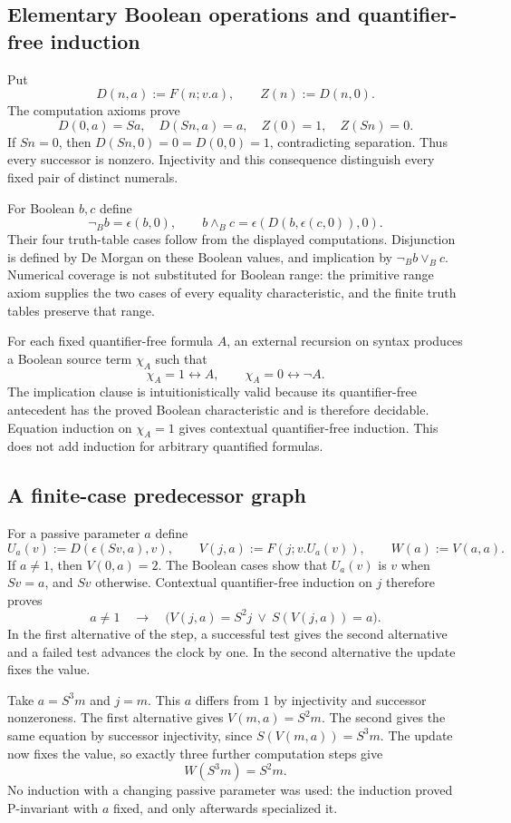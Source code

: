 \subsection{Elementary Boolean operations and quantifier-free induction}
Put
\[
D(n,a):=F(n;v.a),\qquad Z(n):=D(n,0).
\]
The computation axioms prove
\[
D(0,a)=Sa,\quad D(Sn,a)=a,\quad Z(0)=1,\quad Z(Sn)=0.
\]
If $Sn=0$, then $D(Sn,0)=0=D(0,0)=1$, contradicting separation.
Thus every successor is nonzero. Injectivity and this consequence
distinguish every fixed pair of distinct numerals.

For Boolean $b,c$ define
\[
\neg_B b=\epsilon(b,0),\qquad
b\mathbin{\wedge_B}c=\epsilon(D(b,\epsilon(c,0)),0).
\]
Their four truth-table cases follow from the displayed computations.
Disjunction is defined by De Morgan on these Boolean values, and
implication by $\neg_Bb\vee_Bc$. Numerical coverage is not substituted
for Boolean range: the primitive range axiom supplies the two cases
of every equality characteristic, and the finite truth tables preserve
that range.

For each fixed quantifier-free formula $A$, an external recursion on
syntax produces a Boolean source term $\chi_A$ such that
\[
 \chi_A=1\longleftrightarrow A,\qquad
 \chi_A=0\longleftrightarrow\neg A.
\]
The implication clause is intuitionistically valid because its
quantifier-free antecedent has the proved Boolean characteristic and
is therefore decidable. Equation induction on $\chi_A=1$ gives
contextual quantifier-free induction. This does not add induction for
arbitrary quantified formulas.

\subsection{A finite-case predecessor graph}
For a passive parameter $a$ define
\[
 U_a(v):=D(\epsilon(Sv,a),v),\qquad
 V(j,a):=F(j;v.U_a(v)),\qquad W(a):=V(a,a).
\]
If $a\ne1$, then $V(0,a)=2$. The Boolean cases show that $U_a(v)$
is $v$ when $Sv=a$, and $Sv$ otherwise. Contextual quantifier-free
induction on $j$ therefore proves
\[
a\ne1\quad\longrightarrow\quad
\bigl(V(j,a)=S^2j\ \lor\ S(V(j,a))=a\bigr).
\tag{P-invariant}
\]
In the first alternative of the step, a successful test gives the
second alternative and a failed test advances the clock by one. In
the second alternative the update fixes the value.

Take $a=S^3m$ and $j=m$. This $a$ differs from $1$ by injectivity and
successor nonzeroness. The first alternative gives $V(m,a)=S^2m$.
The second gives the same equation by successor injectivity, since
$S(V(m,a))=S^3m$. The update now fixes the value, so exactly three
further computation steps give
\[
                         W(S^3m)=S^2m.\tag{W}
\]
No induction with a changing passive parameter was used: the induction
proved P-invariant with $a$ fixed, and only afterwards specialized it.

